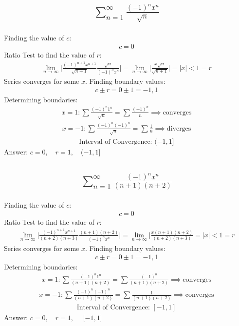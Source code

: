 \documentclass{article}
\begin{document}
\subsection{
	\begin{align*}
		\sum_{n = 1}^\infty \frac{(-1)^n x^n}{\sqrt{n}}
	\end{align*}
}
Finding the value of $c$:
\begin{align*}
	c = 0
\end{align*}
Ratio Test to find the value of $r$:
\begin{align*}
	\lim_{n \to \infty} \bigg| \frac{(-1)^{n + 1}x^{n + 1}}{\sqrt{n + 1}} \frac{\sqrt{n}}{(-1)^n x^n} \bigg| = \lim_{n \to \infty} \bigg| \frac{x \sqrt{n}}{\sqrt{n + 1}} \bigg| = |x| < 1 = r
\end{align*}
Series converges for some $x$. Finding boundary values:
\begin{align*}
	c \pm r = 0 \pm 1 = -1, 1
\end{align*}
Determining boundaries:
\begin{align*}
	x = 1: \sum \frac{(-1)^n 1^n}{\sqrt{n}} = \sum \frac{(-1)^n}{n} \implies \text{converges}
\end{align*}
\begin{align*}
	x = -1: \sum \frac{(-1)^n (-1)^n}{\sqrt{n}} = \sum \frac{1}{n} \implies \text{diverges}
\end{align*}
\begin{align*}
	\text{Interval of Convergence: } (-1, 1]
\end{align*}
Answer: $c = 0, \quad r = 1, \quad $($-1, 1$]

\subsection{
	\begin{align*}
		\sum_{n = 1}^\infty \frac{(-1)^n x^n}{(n + 1)(n + 2)}
	\end{align*}
}
Finding the value of $c$:
\begin{align*}
	c = 0
\end{align*}
Ratio Test to find the value of $r$:
\begin{align*}
	\lim_{n \to \infty} \bigg| \frac{(-1)^{n + 1} x^{n + 1}}{(n + 2)(n + 3)} \frac{(n + 1)(n + 2)}{(-1)^nx^n} \bigg| = \lim_{n \to \infty} \bigg| \frac{x(n + 1)(n + 2)}{(n + 2)(n + 3)} = |x| < 1 = r
\end{align*}
Series converges for some $x$. Finding boundary values:
\begin{align*}
	c \pm r = 0 \pm 1 = -1, 1
\end{align*}
Determining boundaries:
\begin{align*}
	x = 1: \sum \frac{(-1)^n 1^n}{(n + 1)(n + 2)} = \sum \frac{(-1)^n}{(n + 1)(n + 2)} \implies \text{converges}
\end{align*}
\begin{align*}
	x = -1: \sum \frac{(-1)^n (-1)^n}{(n + 1)(n + 2)} = \sum \frac{1}{(n + 1)(n + 2)} \implies \text{converges}
\end{align*}
\begin{align*}
	\text{Interval of Convergence: } [-1, 1]
\end{align*}
Answer: $c = 0, \quad r = 1, \quad $ [$-1, 1$]
\end{document}
